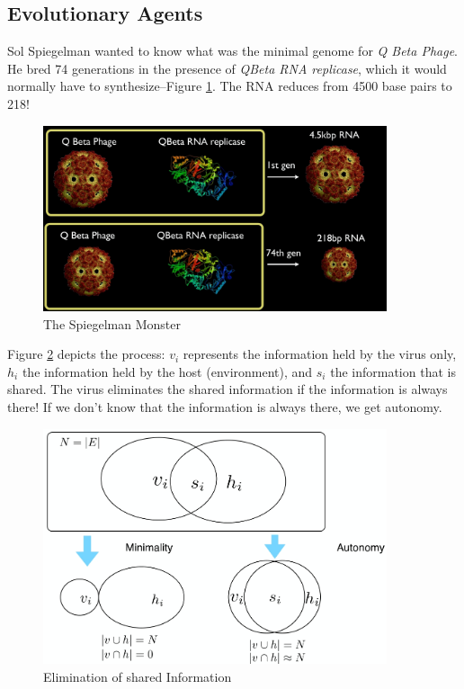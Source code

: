 \documentclass[]{article}
\begin{document}
\subsection{Evolutionary Agents}

Sol Spiegelman wanted to know what was the minimal genome for \textit{Q Beta Phage}. He bred 74 generations in the presence of \textit{QBeta RNA replicase}, which it would normally have to synthesize--Figure \ref{fig:SpiegelmanMonster}. The RNA reduces from 4500 base pairs to 218!\cite{spiegelman1965synthesis}
\begin{figure}[H]
	\caption{The Spiegelman Monster}\label{fig:SpiegelmanMonster}
	\includegraphics[width=0.9\textwidth]{SpiegelmanMonster}
\end{figure}

Figure \ref{fig:SpiegelmanMonsterVenn} depicts the process: $v_i$ represents the information held by the virus only, $h_i$ the information held by the host (environment), and $s_i$ the information that is shared. The virus eliminates the shared information if the information is always there! If we don't know that the information is always there, we get autonomy.

\begin{figure}[H]
	\caption{Elimination of shared Information}\label{fig:SpiegelmanMonsterVenn}
	\includegraphics[width=0.9\textwidth]{SpiegelmanMonsterVenn}
\end{figure}
\end{document}
